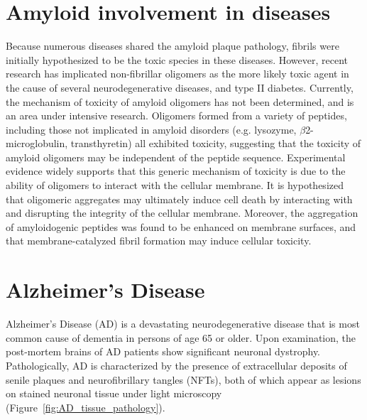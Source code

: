 \section{Amyloid involvement in diseases}

Because numerous diseases shared the amyloid plaque pathology, fibrils were initially hypothesized to be the toxic species in these diseases. However, recent research has implicated non-fibrillar oligomers as the more likely toxic agent in the cause of several neurodegenerative diseases, and type II diabetes.\cite{Haass:2007db,Xue:2009da,Berthelot:2013fs} %
Currently, the mechanism of toxicity of amyloid oligomers has not been determined, and is an area under intensive research.  Oligomers formed from a variety of peptides, including those not implicated in amyloid disorders (e.g. lysozyme, $\beta$2-microglobulin, transthyretin) all exhibited toxicity, suggesting that the toxicity of amyloid oligomers may be independent of the peptide sequence.\cite{Fandrich:2012kb,Kayed:2003en} Experimental evidence widely supports that this generic mechanism of toxicity is due to the ability of oligomers to interact with the cellular membrane.\cite{Martins:2008bz,Walsh:2007fu} It is hypothesized that oligomeric aggregates may ultimately induce cell death by interacting with and disrupting the integrity of the cellular membrane.\cite{Fandrich:2012kb} Moreover, the aggregation of amyloidogenic peptides was found to be enhanced on membrane surfaces,\cite{McLaurin:1997wm,Kayed:2004ul,Yip:2002vx} and that membrane-catalyzed fibril formation may induce cellular toxicity.\cite{Yip:2001tl}


\section{Alzheimer's Disease}
Alzheimer's Disease (AD) is a devastating neurodegenerative disease that is most common cause of dementia in persons of age 65 or older. Upon examination, the post-mortem brains of AD patients show significant neuronal dystrophy. Pathologically, AD is characterized by the presence of extracellular deposits of senile plaques and neurofibrillary tangles (NFTs), both of which appear as lesions on stained neuronal tissue under light microscopy (Figure~\ref{fig:AD_tissue_pathology}).

